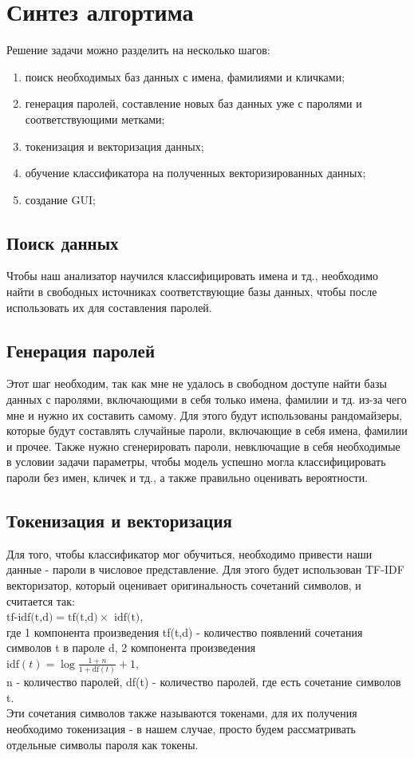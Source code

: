 \documentclass[a4paper,12pt]{article}
\begin{document}
\section{Синтез алгортима}
Решение задачи можно разделить на несколько шагов:
\begin{enumerate}
\item поиск необходимых баз данных с имена, фамилиями и кличками; 
\item генерация паролей, составление новых баз данных уже с паролями и соответствующими метками; 
\item токенизация и векторизация данных; 
\item обучение классификатора на полученных векторизированных данных;
\item создание GUI;
\end{enumerate}
\subsection{Поиск данных}
Чтобы наш анализатор научился классифицировать имена и тд., необходимо найти в свободных источниках соответствующие базы данных, чтобы после использовать их для составления паролей.
\subsection{Генерация паролей}
Этот шаг необходим, так как мне не удалось в свободном доступе найти базы данных с паролями, включающими в себя только имена, фамилии и тд. из-за чего мне и нужно их составить самому. Для этого будут использованы рандомайзеры, которые будут  составлять случайные пароли, включающие в себя имена, фамилии и прочее.
Также нужно сгенерировать пароли, невключащие в себя необходимые в  условии задачи параметры, чтобы модель успешно могла классифицировать пароли без имен, кличек и тд., а также правильно оценивать вероятности.

\subsection{Токенизация и векторизация}
Для того, чтобы классификатор мог обучиться, необходимо привести наши данные - пароли в числовое представление. Для этого будет использован TF-IDF векторизатор, который оценивает оригинальность сочетаний символов, и считается так:\\
$\text{tf-idf(t,d)} = \text{tf(t,d)} \times \text{ idf(t)}$,\\ где 1 компонента произведения tf(t,d) - количество появлений сочетания символов t в пароле d, 2 компонента произведения\\
$\text{idf}(t) = \log{\frac{1 + n}{1+\text{df}(t)}} + 1$,\\ n - количество паролей, df(t) - количество  паролей, где есть сочетание символов t.\\
Эти сочетания символов также называются токенами, для их получения необходимо токенизация - в нашем случае, просто будем рассматривать отдельные символы пароля как токены. 
\end{document}
